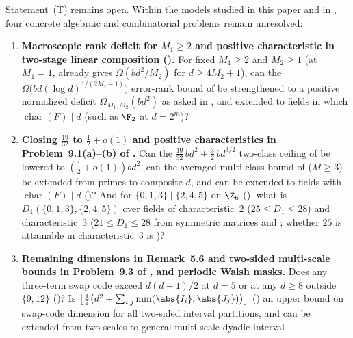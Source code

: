 Statement~(T) remains open. Within the models studied in this paper and in
\cite{SeventeenthPaper2026,ClassUniformMemo2026,SharedDecoders2026}, four concrete algebraic and
combinatorial problems remain unresolved:
\begin{enumerate}[label=\arabic*.]
\item \textbf{Macroscopic rank deficit for $M_1 \ge 2$ and positive characteristic in two-stage linear composition (\cite[Sections~6 and~8]{SharedDecoders2026}).}
  For fixed $M_1 \ge 2$ and $M_2 \ge 1$ (at $M_1 = 1$, \cite[Theorem~6.6]{SharedDecoders2026} already
  gives $\Omega(bd^2 / M_2)$ for $d \ge 4M_2 + 1$), can the $\Omega\bigl(bd(\log d)^{1/(2M_2 - 1)}\bigr)$ error-rank bound
  of  be strengthened to a positive normalized deficit $\Omega_{M_1,M_2}(bd^2)$ as asked
  in \cite[Section~8]{SharedDecoders2026}, and extended to fields in which $\operatorname{char}(F) \mid d$
  (such as $\F_2$ at $d = 2^m$)?
\item \textbf{Closing $\frac{19}{32}$ to $\frac{1}{2} + o(1)$ and positive characteristics in Problem~9.1(a)--(b) of \cite{SeventeenthPaper2026}.}
  Can the $\frac{19}{32}\,bd^2 + \frac{3}{2}\,bd^{3/2}$ two-class ceiling of 
  be lowered to $(\frac{1}{2} + o(1))bd^2$, can the averaged multi-class bound of
   ($M \ge 3$) be extended from primes to composite $d$, and can
   be extended to fields with
  $\operatorname{char}(F) \mid d$ (\cite[Problem~9.1(a)]{SeventeenthPaper2026})? And for
  $\{0,1,3\} \mid \{2,4,5\}$ on $\Z_6$ (), what is
  $D_1(\{0,1,3\},\{2,4,5\})$ over fields of characteristic~$2$ ($25 \le D_1 \le 28$) and
  characteristic~$3$ ($21 \le D_1 \le 28$ from symmetric matrices and
  \cite[Theorem~6.4]{SeventeenthPaper2026}; whether $25$ is attainable in characteristic~$3$ is
  \cite[Problem~6.1]{ClassUniformMemo2026})?
\item \textbf{Remaining dimensions in Remark~5.6 and two-sided multi-scale bounds in Problem~9.3 of \cite{SeventeenthPaper2026}, and periodic Walsh masks.}
  Does any three-term swap code exceed $d(d+1)/2$ at $d = 5$ or at any $d \ge 8$ outside $\{9, 12\}$
  (\cite[Remark~5.6]{SeventeenthPaper2026})? Is $\bigl\lfloor \frac{1}{2}\bigl(d^2 +
  \sum_{i, j} \min(\abs{I_i}, \abs{J_j})\bigr)\bigr\rfloor$ () an upper
  bound on swap-code dimension for all two-sided interval partitions, and can
   be extended from two scales to general multi-scale dyadic interval

\end{enumerate}
